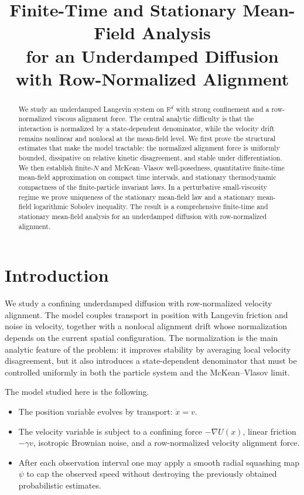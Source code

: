 \documentclass[11pt]{article}
\title{Finite-Time and Stationary Mean-Field Analysis\\
for an Underdamped Diffusion with Row-Normalized Alignment}
\author{}
\date{}
\theoremstyle{definition}
\theoremstyle{remark}
\newcommand{\R}{\mathbb{R}}
\begin{document}
\maketitle

\begin{abstract}
We study an underdamped Langevin system on $\R^d$ with strong confinement and a
row-normalized viscous alignment force. The central analytic difficulty is that
the interaction is normalized by a state-dependent denominator, while the
velocity drift remains nonlinear and nonlocal at the mean-field level. We first
prove the structural estimates that make the model tractable: the normalized
alignment force is uniformly bounded, dissipative on relative kinetic
disagreement, and stable under differentiation. We then establish finite-$N$
and McKean--Vlasov well-posedness, quantitative finite-time mean-field
approximation on compact time intervals, and stationary thermodynamic
compactness of the finite-particle invariant laws. In a perturbative
small-viscosity regime we prove uniqueness of the stationary mean-field law and
a stationary mean-field logarithmic Sobolev inequality. The result is a
comprehensive finite-time and stationary mean-field analysis for an underdamped
diffusion with row-normalized alignment.
\end{abstract}

\tableofcontents

\section{Introduction}

We study a confining underdamped diffusion with row-normalized velocity
alignment. The model couples transport in position with Langevin friction and
noise in velocity, together with a nonlocal alignment drift whose normalization
depends on the current spatial configuration. The normalization is the main
analytic feature of the problem: it improves stability by averaging local
velocity disagreement, but it also introduces a state-dependent denominator
that must be controlled uniformly in both the particle system and the
McKean--Vlasov limit.

The model studied here is the following.

\begin{itemize}[leftmargin=1.5em]
\item The position variable evolves by transport: $\dot x = v$.
\item The velocity variable is subject to a confining force $-\nabla U(x)$,
linear friction $-\gamma v$, isotropic Brownian noise, and a row-normalized
velocity alignment force.
\item After each observation interval one may apply a smooth radial squashing
map $\psi$ to cap the observed speed without destroying the previously obtained
probabilistic estimates.
\end{itemize}
\end{document}
